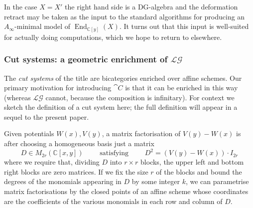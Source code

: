 \documentclass[english,letter paper,12pt,leqno]{article}
\theoremstyle{example}
\numberwithin{equation}{section}
\def\LG{\mathcal{LG}}
\def\be{\begin{equation}}
\def\ee{\end{equation}}
\def\nC{\mathds{C}}
\DeclareMathOperator{\End}{End}
\begin{document}
In the case $X = X'$ the right hand side is a DG-algebra and the deformation retract may be taken as the input to the standard algorithms for producing an $A_\infty$-minimal model of $\End_{\nC[y]}(X)$. It turns out that this input is well-suited for actually doing computations, which we hope to return to elsewhere.

\subsubsection{Cut systems: a geometric enrichment of $\LG$}

The \emph{cut systems} of the title are bicategories enriched over affine schemes. Our primary motivation for introducing $\cat{C}$ is that it can be enriched in this way (whereas $\LG$ cannot, because the composition is infinitary). For context we sketch the definition of a cut system here; the full definition will appear in a sequel to the present paper.

Given potentials $W(x), V(y)$, a matrix factorisation of $V(y) - W(x)$ is after choosing a homogeneous basis just a matrix
\be\label{eq:intro_capitalD}
D \in M_{2r}( \nC[x,y] ) \qquad \text{ satisfying } \qquad D^2 = (V(y) - W(x)) \cdot I_{2r}
\ee
where we require that, dividing $D$ into $r \times r$ blocks, the upper left and bottom right blocks are zero matrices. If we fix the size $r$ of the blocks and bound the degrees of the monomials appearing in $D$ by some integer $k$, we can parametrise matrix factorisations by the closed points of an affine scheme whose coordinates are the coefficients of the various monomials in each row and column of $D$. 
\end{document}
